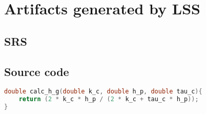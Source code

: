 \documentclass{sig-alternate-05-2015}
\newcommand{\lss}{LSS}
\begin{document}

\section{Artifacts generated by \lss} \label{app:gen}
\subsection{SRS}
\subsection{Source code}
\begin{lstlisting}[language=C, frame=single, showstringspaces=false, basicstyle=\tiny]
double calc_h_g(double k_c, double h_p, double tau_c){
    return (2 * k_c * h_p / (2 * k_c + tau_c * h_p));
}
\end{lstlisting}
\end{document}
